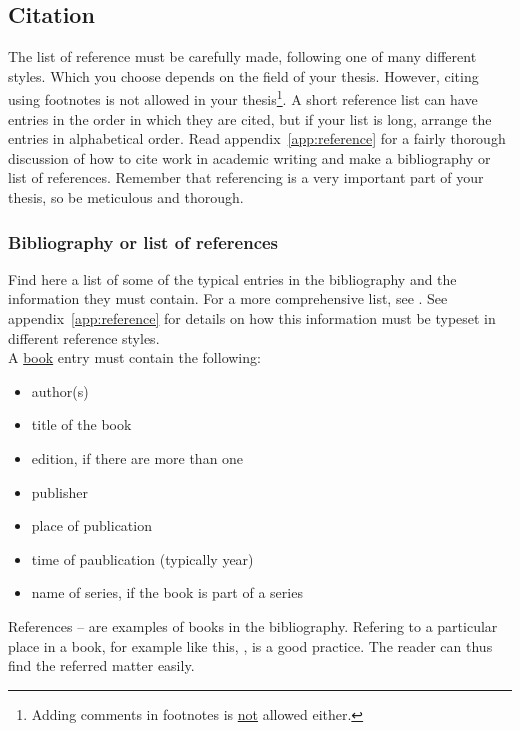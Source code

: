 \documentclass[english, 12pt, a4paper, elec, utf8, a-2b, online]{aaltothesis}
\begin{document}
\subsection{Citation}

The list of reference must be carefully made, following one of many different 
styles. Which you choose depends on the field of your thesis. However, citing 
using footnotes is not allowed in your thesis\footnote{Adding comments in 
footnotes is \underline{not} allowed either.}. A short reference list can have 
entries in the order in which they are cited, but if your list is long, arrange 
the entries in alphabetical order. Read appendix~\ref{app:reference} for a 
fairly thorough discussion of how to cite work in academic writing and make a 
bibliography or list of references. Remember that referencing is a very 
important part of your thesis, so be meticulous and thorough.

\subsubsection{Bibliography or list of references}

Find here a list of some of the typical entries in the bibliography and the 
information they must contain. For a more comprehensive list, see 
\cite{aaltolib}. See appendix~\ref{app:reference} for details on how this 
information must be typeset in different reference styles.\\

\noindent
A \underline{book} entry must contain the following:
\begin{itemize}
\setlength{\itemsep}{-3pt}
\item[--]author(s) 
\item[--]title of the book
\item[--]edition, if there are more than one
\item[--]publisher
\item[--]place of publication
\item[--]time of paublication (typically year)
\item[--]name of series, if the book is part of a series
\end{itemize}
References \cite{Kauranen}--\cite{Koblitz} are examples of books in the 
bibliography. Refering to a particular place in a book, for example like this, 
\cite[s.\ 83--124]{Koblitz}, is a good practice. The reader can thus find the 
referred matter easily.\\
\end{document}
